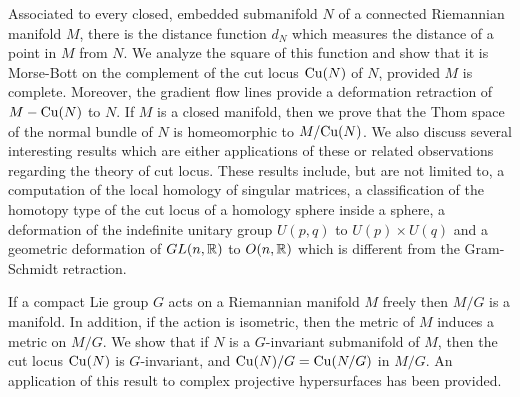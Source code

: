 Associated to every closed, embedded submanifold $N$ of a connected Riemannian manifold $M$, there is the distance function $d_N$ which measures the distance of a point in $M$ from $N$. We analyze the square of this function and show that it is Morse-Bott on the complement of the cut locus $\cutn$ of $N$, provided $M$ is complete. Moreover, the gradient flow lines provide a deformation retraction of $M-\cutn$ to $N$. If $M$ is a closed manifold, then we prove that the Thom space of the normal bundle of $N$ is homeomorphic to $M/\cutn$. We also discuss several interesting results which are either applications of these or related observations regarding the theory of cut locus. These results include, but are not limited to, a computation of the local homology of singular matrices, a classification of the homotopy type of the cut locus of a homology sphere inside a sphere, a deformation of the indefinite unitary group $U(p,q)$ to $U(p)\times U(q)$ and a geometric deformation of $GL(n,\R)$ to $O(n,\R)$ which is different from the Gram-Schmidt retraction. 

\bigskip
\noindent If a compact Lie group $G$ acts on a Riemannian manifold $M$ freely then $M/G$ is a manifold. In addition, if the action is isometric, then the metric of $M$ induces a metric on $M/G$.  We show that if $N$ is a $G$-invariant submanifold of $M$, then the cut locus $\cutn$ is $G$-invariant, and $\cutn/G = \cutn[N/G]$ in $M/G$. An application of this result to complex projective hypersurfaces has been provided.